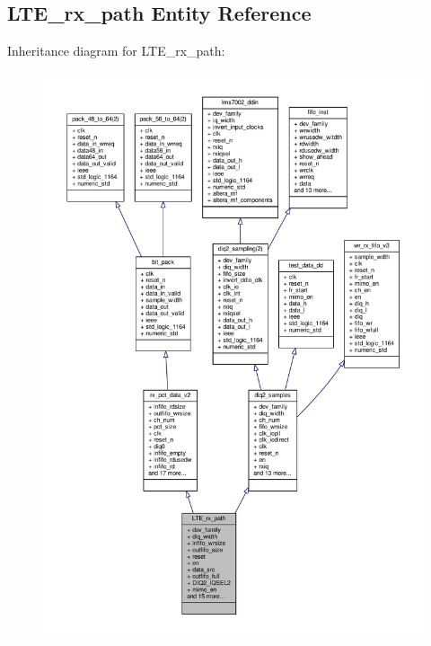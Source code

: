 \subsection{L\+T\+E\+\_\+rx\+\_\+path Entity Reference}
\label{classLTE__rx__path}


Inheritance diagram for L\+T\+E\+\_\+rx\+\_\+path\+:\nopagebreak
\begin{figure}[H]
\begin{center}
\leavevmode
\includegraphics[width=350pt]{dd/d14/classLTE__rx__path__inherit__graph}
\end{center}
\end{figure}


